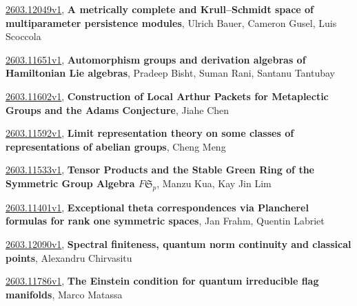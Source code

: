 \documentclass[9pt, a4paper]{article}
\theoremstyle{plain}
\theoremstyle{definition}
\theoremstyle{remark}
\newcommand{\arxiv}[3]{\href{https://arxiv.org/abs/#1}{#1}, \textbf{\textcolor{arxivblue}{#2}}, #3}
\begin{document}
\arxiv{2603.12049v1}{A metrically complete and Krull--Schmidt space of multiparameter persistence modules}{Ulrich Bauer, Cameron Gusel, Luis Scoccola}

\arxiv{2603.11651v1}{Automorphism groups and derivation algebras of Hamiltonian Lie algebras}{Pradeep Bisht, Suman Rani, Santanu Tantubay}

\arxiv{2603.11602v1}{Construction of Local Arthur Packets for Metaplectic Groups and the Adams Conjecture}{Jiahe Chen}

\arxiv{2603.11592v1}{Limit representation theory on some classes of representations of abelian groups}{Cheng Meng}

\arxiv{2603.11533v1}{Tensor Products and the Stable Green Ring of the Symmetric Group Algebra $F\mathfrak{S}_p$}{Manzu Kua, Kay Jin Lim}

\arxiv{2603.11401v1}{Exceptional theta correspondences via Plancherel formulas for rank one symmetric spaces}{Jan Frahm, Quentin Labriet}

\arxiv{2603.12090v1}{Spectral finiteness, quantum norm continuity and classical points}{Alexandru Chirvasitu}

\arxiv{2603.11786v1}{The Einstein condition for quantum irreducible flag manifolds}{Marco Matassa}

\end{document}
